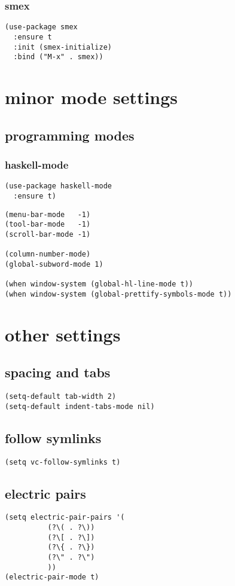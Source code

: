 \documentclass[11pt]{article}
\begin{document}
\subsubsection{smex}
\label{sec:org6de0025}
\begin{verbatim}
(use-package smex
  :ensure t
  :init (smex-initialize)
  :bind ("M-x" . smex))
\end{verbatim}
\section{minor mode settings}
\label{sec:orgf78f2ff}
\subsection{programming modes}
\label{sec:org1bc3b85}
\subsubsection{haskell-mode}
\label{sec:org9adad64}
\begin{verbatim}
(use-package haskell-mode
  :ensure t)
\end{verbatim}

\begin{verbatim}
(menu-bar-mode   -1)
(tool-bar-mode   -1)
(scroll-bar-mode -1)

(column-number-mode)
(global-subword-mode 1)

(when window-system (global-hl-line-mode t))
(when window-system (global-prettify-symbols-mode t))
\end{verbatim}
\section{other settings}
\label{sec:orgcfca7f8}
\subsection{spacing and tabs}
\label{sec:org5710bf3}
\begin{verbatim}
(setq-default tab-width 2)
(setq-default indent-tabs-mode nil)
\end{verbatim}
\subsection{follow symlinks}
\label{sec:org71fb21f}
\begin{verbatim}
(setq vc-follow-symlinks t)
\end{verbatim}
\subsection{electric pairs}
\label{sec:org95c2f69}
\begin{verbatim}
(setq electric-pair-pairs '(
          (?\( . ?\))
          (?\[ . ?\])
          (?\{ . ?\})
          (?\" . ?\")
          ))
(electric-pair-mode t)
\end{verbatim}
\end{document}
